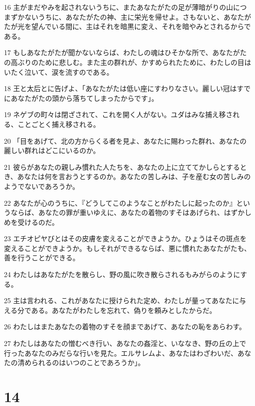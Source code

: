 \par 16 主がまだやみを起されないうちに、またあなたがたの足が薄暗がりの山につまずかないうちに、あなたがたの神、主に栄光を帰せよ。さもないと、あなたがたが光を望んでいる間に、主はそれを暗黒に変え、それを暗やみとされるからである。
\par 17 もしあなたがたが聞かないならば、わたしの魂はひそかな所で、あなたがたの高ぶりのために悲しむ。また主の群れが、かすめられたために、わたしの目はいたく泣いて、涙を流すのである。
\par 18 王と太后とに告げよ、「あなたがたは低い座にすわりなさい。麗しい冠はすでにあなたがたの頭から落ちてしまったからです」。
\par 19 ネゲブの町々は閉ざされて、これを開く人がない。ユダはみな捕え移される、ことごとく捕え移される。
\par 20 「目をあげて、北の方からくる者を見よ、あなたに賜わった群れ、あなたの麗しい群れはどこにいるのか。
\par 21 彼らがあなたの親しみ慣れた人たちを、あなたの上に立ててかしらとするとき、あなたは何を言おうとするのか。あなたの苦しみは、子を産む女の苦しみのようでないであろうか。
\par 22 あなたが心のうちに、『どうしてこのようなことがわたしに起ったのか』というならば、あなたの罪が重いゆえに、あなたの着物のすそはあげられ、はずかしめを受けるのだ。
\par 23 エチオピヤびとはその皮膚を変えることができようか。ひょうはその斑点を変えることができようか。もしそれができるならば、悪に慣れたあなたがたも、善を行うことができる。
\par 24 わたしはあなたがたを散らし、野の風に吹き散らされるもみがらのようにする。
\par 25 主は言われる、これがあなたに授けられた定め、わたしが量ってあなたに与える分である。あなたがわたしを忘れて、偽りを頼みとしたからだ。
\par 26 わたしはまたあなたの着物のすそを顔まであげて、あなたの恥をあらわす。
\par 27 わたしはあなたの憎むべき行い、あなたの姦淫と、いななき、野の丘の上で行ったあなたのみだらな行いを見た。エルサレムよ、あなたはわざわいだ、あなたの清められるのはいつのことであろうか」。

\chapter{14}

